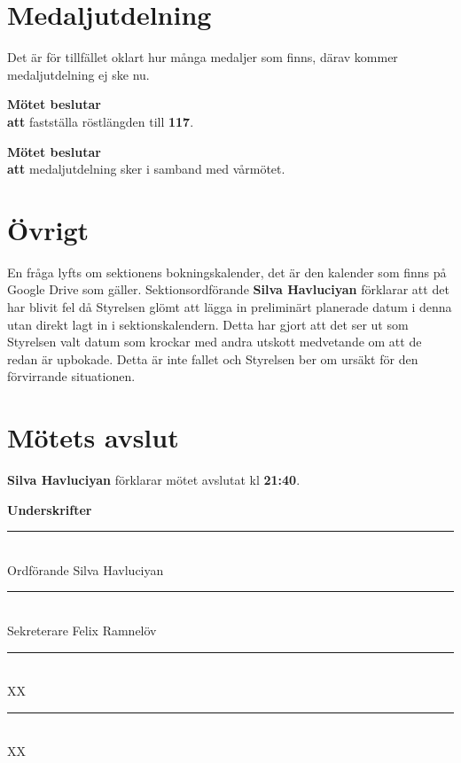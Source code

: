 \documentclass{datateknologsektionen-document}
\newcommand{\ind}{\hspace*{2em}}
\newcommand{\motetbeslutar}{\textbf{Mötet beslutar}}
\newcommand{\att}{\\\ind\textbf{att}}
\newcommand{\rostlangd}[1]{\motetbeslutar\att{} fastställa röstlängden till \textbf{#1}.}
\begin{document}
\pagebreak

\section{Medaljutdelning}

Det är för tillfället oklart hur många medaljer som finns, därav kommer medaljutdelning ej ske nu.

\rostlangd{117}

\motetbeslutar\att{} medaljutdelning sker i samband med vårmötet.

\section{Övrigt}

En fråga lyfts om sektionens bokningskalender, det är den kalender som finns på Google Drive som gäller. Sektionsordförande \textbf{Silva Havluciyan} 
förklarar att det har blivit fel då Styrelsen glömt att lägga in preliminärt planerade datum i denna utan direkt lagt in i sektionskalendern. 
Detta har gjort att det ser ut som Styrelsen valt datum som krockar med andra utskott medvetande om att de redan är upbokade. Detta är inte 
fallet och Styrelsen ber om ursäkt för den förvirrande situationen.  

\section{Mötets avslut}


\textbf{Silva Havluciyan} förklarar mötet avslutat kl \textbf{21:40}.


\pagebreak
{\Large\bfseries Underskrifter}

\vspace*{1.2cm}
\noindent\rule{8cm}{1pt}\\
Ordförande Silva Havluciyan

\vspace*{1.2cm}
\noindent\rule{8cm}{1pt}\\
Sekreterare Felix Ramnelöv

\vspace*{1.2cm}
\noindent\rule{8cm}{1pt}\\
XX

\vspace*{1.2cm}
\noindent\rule{8cm}{1pt}\\
XX
\end{document}
